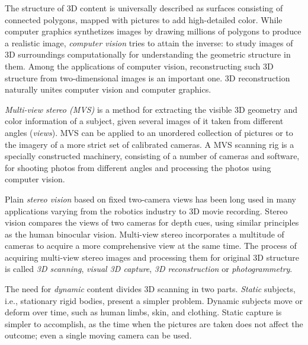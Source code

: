 The structure of 3D content is universally described as surfaces consisting of connected polygons, mapped with pictures to add high-detailed color.
While computer graphics synthetizes images by drawing millions of polygons to produce a realistic image, \emph{computer vision} tries to attain the inverse:
to study images of 3D surroundings computationally for understanding the geometric structure in them.
Among the applications of computer vision, reconstructing such 3D structure from two-dimensional images is an important one.
3D reconstruction naturally unites computer vision and computer graphics.


\emph{Multi-view stereo (MVS)} is a method for extracting the visible 3D geometry and color information of a subject, given several images of it taken from different angles (\emph{views}).
MVS can be applied to an unordered collection of pictures or to the imagery of a more strict set of calibrated cameras.
A MVS scanning rig is a specially constructed machinery, consisting of a number of cameras and software, for shooting photos from different angles and processing the photos using computer vision.


Plain \emph{stereo vision} based on fixed two-camera views has been long used in many applications varying from the robotics industry to 3D movie recording.
Stereo vision compares the views of two cameras for depth cues, using similar principles as the human binocular vision.
Multi-view stereo incorporates a multitude of cameras to acquire a more comprehensive view at the same time.
The process of acquiring multi-view stereo images and processing them for original 3D structure is called \emph{3D scanning}, \emph{visual 3D capture}, \emph{3D reconstruction} or \emph{photogrammetry}.


The need for \emph{dynamic} content divides 3D scanning in two parts.
\emph{Static} subjects, i.e., stationary rigid bodies, present a simpler problem.
Dynamic subjects move or deform over time, such as human limbs, skin, and clothing.
Static capture is simpler to accomplish, as the time when the pictures are taken does not affect the outcome; even a single moving camera can be used.


